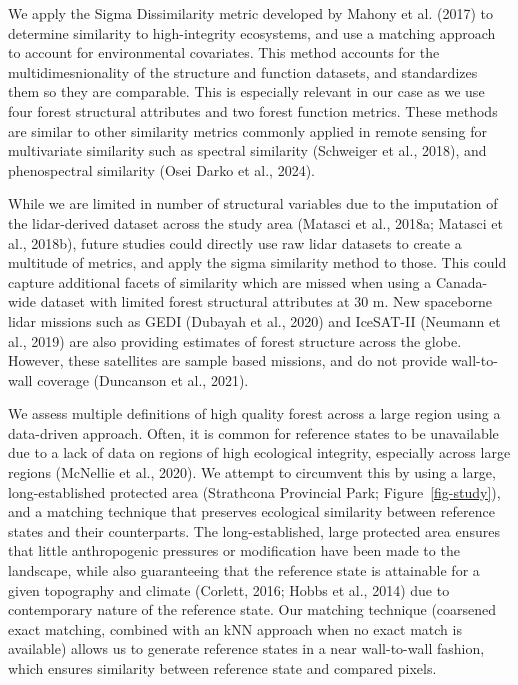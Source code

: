 \documentclass[
]{agujournal2019}
\begin{document}
We apply the Sigma Dissimilarity metric developed by Mahony et al.
(2017) to determine similarity to high-integrity ecosystems, and use a
matching approach to account for environmental covariates. This method
accounts for the multidimesnionality of the structure and function
datasets, and standardizes them so they are comparable. This is
especially relevant in our case as we use four forest structural
attributes and two forest function metrics. These methods are similar to
other similarity metrics commonly applied in remote sensing for
multivariate similarity such as spectral similarity (Schweiger et al.,
2018), and phenospectral similarity (Osei Darko et al., 2024).

While we are limited in number of structural variables due to the
imputation of the lidar-derived dataset across the study area (Matasci
et al., 2018a; Matasci et al., 2018b), future studies could directly use
raw lidar datasets to create a multitude of metrics, and apply the sigma
similarity method to those. This could capture additional facets of
similarity which are missed when using a Canada-wide dataset with
limited forest structural attributes at 30 m. New spaceborne lidar
missions such as GEDI (Dubayah et al., 2020) and IceSAT-II (Neumann et
al., 2019) are also providing estimates of forest structure across the
globe. However, these satellites are sample based missions, and do not
provide wall-to-wall coverage (Duncanson et al., 2021).

We assess multiple definitions of high quality forest across a large
region using a data-driven approach. Often, it is common for reference
states to be unavailable due to a lack of data on regions of high
ecological integrity, especially across large regions (McNellie et al.,
2020). We attempt to circumvent this by using a large, long-established
protected area (Strathcona Provincial Park; Figure~\ref{fig-study}), and
a matching technique that preserves ecological similarity between
reference states and their counterparts. The long-established, large
protected area ensures that little anthropogenic pressures or
modification have been made to the landscape, while also guaranteeing
that the reference state is attainable for a given topography and
climate (Corlett, 2016; Hobbs et al., 2014) due to contemporary nature
of the reference state. Our matching technique (coarsened exact
matching, combined with an kNN approach when no exact match is
available) allows us to generate reference states in a near wall-to-wall
fashion, which ensures similarity between reference state and compared
pixels.
\end{document}
